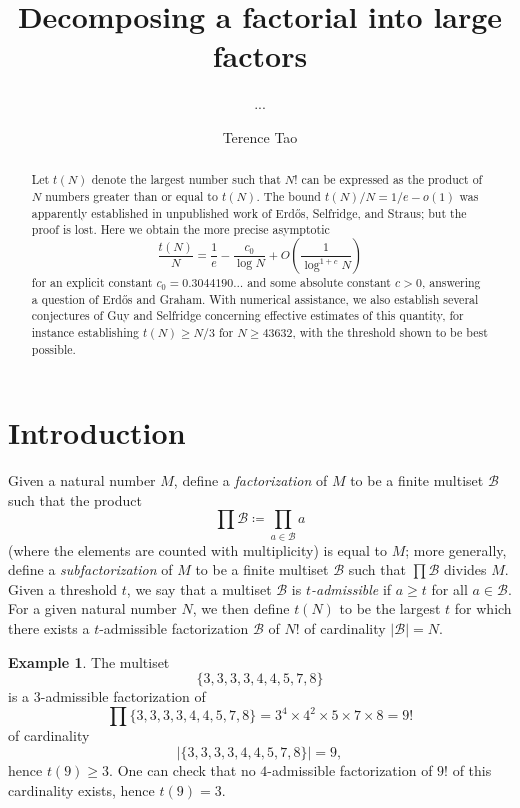 \documentclass[12pt,a4paper,reqno]{amsart}
\numberwithin{equation}{section}
\theoremstyle{plain}
\theoremstyle{definition}
\newtheorem{example}[theorem]{Example}
\newcommand\tuple{{\mathcal B}}
\begin{document}
\title{Decomposing a factorial into large factors}


\author{...}
\address{???}

\author{Terence Tao}
\address{UCLA Department of Mathematics, Los Angeles, CA 90095-1555.}

\begin{abstract}  Let $t(N)$ denote the largest number such that $N!$ can be expressed as the product of $N$ numbers greater than or equal to $t(N)$.
The bound $t(N)/N = 1/e-o(1)$ was apparently established in unpublished work of Erd\H{o}s, Selfridge, and Straus; but the proof is lost.  Here we obtain the more precise asymptotic 
$$ \frac{t(N)}{N} = \frac{1}{e} - \frac{c_0}{\log N} + O\left( \frac{1}{\log^{1+c} N} \right)$$
for an explicit constant $c_0 = 0.3044190\dots$ and some absolute constant $c>0$, answering a question of Erd\H{o}s and Graham.  With numerical assistance, we also establish several conjectures of Guy and Selfridge concerning effective estimates of this quantity, for instance establishing $t(N) \geq N/3$ for $N \geq 43632$, with the threshold shown to be best possible.\end{abstract}


\maketitle


\section{Introduction}

Given a natural number $M$, define a \emph{factorization} of $M$ to be a finite multiset $\tuple$ such that the product
$$ \prod \tuple \coloneqq \prod_{a \in \tuple} a$$
(where the elements are counted with multiplicity) is equal to $M$; more generally, define a \emph{subfactorization} of $M$ to be a finite multiset $\tuple$ such that $\prod \tuple$ divides $M$.  Given a threshold $t$, we say that a multiset $\tuple$ is \emph{$t$-admissible} if $a \geq t$ for all $a \in \tuple$.  For a given natural number $N$, we then define $t(N)$ to be the largest $t$ for which there exists a $t$-admissible factorization $\tuple$ of $N!$ of cardinality $|\tuple|=N$.  

\begin{example}\label{nine}  The multiset
  $$ \{ 3,3,3,3,4,4,5,7,8\}$$
  is a $3$-admissible factorization of 
$$ \prod \{ 3,3,3,3,4,4,5,7,8\} = 3^4 \times 4^2 \times 5 \times 7 \times 8 = 9!$$
of cardinality 
$$|\{ 3,3,3,3,4,4,5,7,8\}| = 9,$$
 hence $t(9) \geq 3$.  One can check that no $4$-admissible factorization of $9!$ of this cardinality exists, hence $t(9) = 3$.
\end{example}
\end{document}
